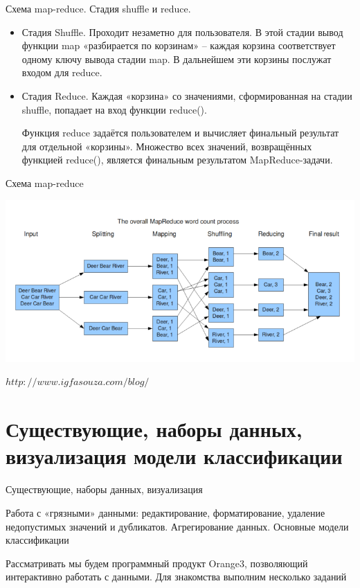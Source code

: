 \documentclass{beamer}
\begin{document}
\begin{frame}{Схема map-reduce. Стадия shuffle и  reduce.} 


\begin{itemize}

\item   Стадия Shuffle. Проходит незаметно для пользователя. В этой стадии вывод функции map «разбирается по корзинам» – каждая корзина соответствует одному ключу вывода 
стадии map. В дальнейшем эти корзины послужат входом для reduce.


\item   Стадия Reduce. Каждая «корзина» со значениями, сформированная на стадии shuffle, попадает на вход функции reduce().

Функция reduce задаётся пользователем и вычисляет финальный результат для отдельной «корзины».
Множество всех значений, возвращённых функцией reduce(), является финальным результатом MapReduce-задачи. 

\end{itemize}

\end{frame}

\begin{frame}{Схема map-reduce}

\includegraphics[scale=0.4]{ris_01.png}

$http://www.igfasouza.com/blog/$

\end{frame}




\section{ Существующие, наборы данных, визуализация модели классификации}

\begin{frame}{Существующие, наборы данных, визуализация}

Работа с «грязными» данными: редактирование, форматирование, 
удаление недопустимых значений и дубликатов. 
Агрегирование данных. Основные модели классификации

Рассматривать мы будем  программный продукт Orange3, позволяющий  интерактивно работать с данными.
Для знакомства выполним несколько заданий



\end{frame}
\end{document}
